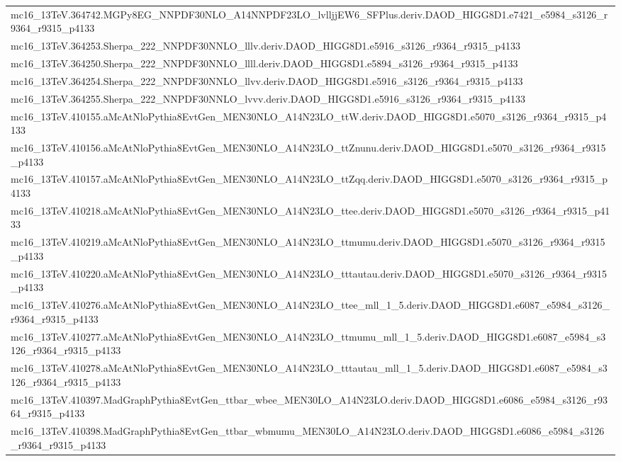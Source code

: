 \begin{adjustwidth}{-3em}{-3em}
\begin{longtable}{l}
mc16\_13TeV.364742.MGPy8EG\_NNPDF30NLO\_A14NNPDF23LO\_lvlljjEW6\_SFPlus.deriv.DAOD\_HIGG8D1.e7421\_e5984\_s3126\_r9364\_r9315\_p4133 \\
mc16\_13TeV.364253.Sherpa\_222\_NNPDF30NNLO\_lllv.deriv.DAOD\_HIGG8D1.e5916\_s3126\_r9364\_r9315\_p4133 \\
mc16\_13TeV.364250.Sherpa\_222\_NNPDF30NNLO\_llll.deriv.DAOD\_HIGG8D1.e5894\_s3126\_r9364\_r9315\_p4133 \\
mc16\_13TeV.364254.Sherpa\_222\_NNPDF30NNLO\_llvv.deriv.DAOD\_HIGG8D1.e5916\_s3126\_r9364\_r9315\_p4133 \\
mc16\_13TeV.364255.Sherpa\_222\_NNPDF30NNLO\_lvvv.deriv.DAOD\_HIGG8D1.e5916\_s3126\_r9364\_r9315\_p4133 \\
mc16\_13TeV.410155.aMcAtNloPythia8EvtGen\_MEN30NLO\_A14N23LO\_ttW.deriv.DAOD\_HIGG8D1.e5070\_s3126\_r9364\_r9315\_p4133 \\
mc16\_13TeV.410156.aMcAtNloPythia8EvtGen\_MEN30NLO\_A14N23LO\_ttZnunu.deriv.DAOD\_HIGG8D1.e5070\_s3126\_r9364\_r9315\_p4133 \\
mc16\_13TeV.410157.aMcAtNloPythia8EvtGen\_MEN30NLO\_A14N23LO\_ttZqq.deriv.DAOD\_HIGG8D1.e5070\_s3126\_r9364\_r9315\_p4133 \\
mc16\_13TeV.410218.aMcAtNloPythia8EvtGen\_MEN30NLO\_A14N23LO\_ttee.deriv.DAOD\_HIGG8D1.e5070\_s3126\_r9364\_r9315\_p4133 \\
mc16\_13TeV.410219.aMcAtNloPythia8EvtGen\_MEN30NLO\_A14N23LO\_ttmumu.deriv.DAOD\_HIGG8D1.e5070\_s3126\_r9364\_r9315\_p4133 \\
mc16\_13TeV.410220.aMcAtNloPythia8EvtGen\_MEN30NLO\_A14N23LO\_tttautau.deriv.DAOD\_HIGG8D1.e5070\_s3126\_r9364\_r9315\_p4133 \\
mc16\_13TeV.410276.aMcAtNloPythia8EvtGen\_MEN30NLO\_A14N23LO\_ttee\_mll\_1\_5.deriv.DAOD\_HIGG8D1.e6087\_e5984\_s3126\_r9364\_r9315\_p4133 \\
mc16\_13TeV.410277.aMcAtNloPythia8EvtGen\_MEN30NLO\_A14N23LO\_ttmumu\_mll\_1\_5.deriv.DAOD\_HIGG8D1.e6087\_e5984\_s3126\_r9364\_r9315\_p4133 \\
mc16\_13TeV.410278.aMcAtNloPythia8EvtGen\_MEN30NLO\_A14N23LO\_tttautau\_mll\_1\_5.deriv.DAOD\_HIGG8D1.e6087\_e5984\_s3126\_r9364\_r9315\_p4133 \\
mc16\_13TeV.410397.MadGraphPythia8EvtGen\_ttbar\_wbee\_MEN30LO\_A14N23LO.deriv.DAOD\_HIGG8D1.e6086\_e5984\_s3126\_r9364\_r9315\_p4133 \\
mc16\_13TeV.410398.MadGraphPythia8EvtGen\_ttbar\_wbmumu\_MEN30LO\_A14N23LO.deriv.DAOD\_HIGG8D1.e6086\_e5984\_s3126\_r9364\_r9315\_p4133 \\

\end{longtable}
\end{adjustwidth}
